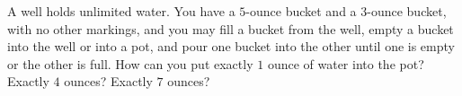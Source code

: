 A well holds unlimited water. You have a $5$-ounce bucket and a $3$-ounce bucket, with no other markings, and you may fill a bucket from the well, empty a bucket into the well or into a pot, and pour one bucket into the other until one is empty or the other is full. How can you put exactly $1$ ounce of water into the pot? Exactly $4$ ounces? Exactly $7$ ounces?

